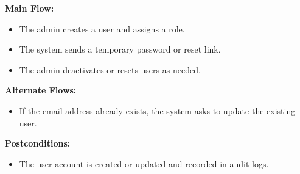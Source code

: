 \textbf{Main Flow:}
\begin{itemize}
    \item The admin creates a user and assigns a role.
    \item The system sends a temporary password or reset link.
    \item The admin deactivates or resets users as needed.
\end{itemize}

\textbf{Alternate Flows:}
\begin{itemize}
    \item If the email address already exists, the system asks to update the existing user.
\end{itemize}

\textbf{Postconditions:}
\begin{itemize}
    \item The user account is created or updated and recorded in audit logs.
\end{itemize}
